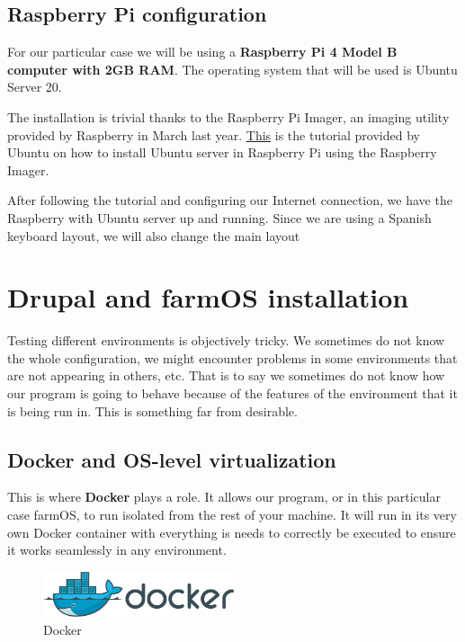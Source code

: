 \vspace{6mm}
\subsection{Raspberry Pi configuration}
For our particular case we will be using a \textbf{Raspberry Pi 4 Model B computer with 2GB RAM}. The operating system that will be used is Ubuntu Server 20.

The installation is trivial thanks to the Raspberry Pi Imager, an imaging utility provided by Raspberry in March last year. \href{https://ubuntu.com/tutorials/how-to-install-ubuntu-on-your-raspberry-pi#1-overview}{This} is the tutorial provided by Ubuntu on how to install Ubuntu server in Raspberry Pi using the Raspberry Imager.

After following the tutorial and configuring our Internet connection, we have the Raspberry with Ubuntu server up and running. Since we are using a Spanish keyboard layout, we will also change the main layout

\vspace{7mm}
\section{Drupal and farmOS installation}

Testing different environments is objectively tricky. We sometimes do not know the whole configuration, we might encounter problems in some environments that are not appearing in others, etc. That is to say we sometimes do not know how our program is going to behave because of the features of the environment that it is being run in. This is something far from desirable.

\vspace{5mm}
\subsection{Docker and OS-level virtualization}
This is where \textbf{Docker}\cite{docker} plays a role. It allows our program, or in this particular case farmOS, to run isolated from the rest of your machine. It will run in its very own Docker container with everything is needs to correctly be executed to ensure it works seamlessly in any environment.

\begin{figure}[H]
    \centering
    \includegraphics[width=0.5\textwidth]{fig/docker_logo.png}
        \caption{Docker}
    \label{fig:docker-logo}
\end{figure}

